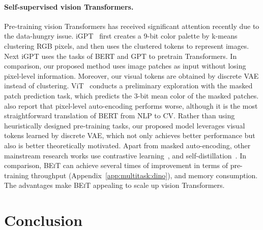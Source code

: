 \documentclass{article}
\newcommand\our{\textsc{BEiT}}
\begin{document}
\paragraph{Self-supervised vision Transformers.}
Pre-training vision Transformers has received significant attention recently due to the data-hungry issue.
iGPT~\citep{igpt} first creates a 9-bit color palette by k-means clustering RGB pixels, and then uses the clustered tokens to represent images. Next iGPT uses the tasks of BERT and GPT to pretrain Transformers.
In comparison, our proposed method uses image patches as input without losing pixel-level information. Moreover, our visual tokens are obtained by discrete VAE instead of clustering.
ViT~\citep{vit} conducts a preliminary exploration with the masked patch prediction task, which predicts the 3-bit mean color of the masked patches.
\citep{vit} also report that pixel-level auto-encoding performs worse, although it is the most straightforward translation of BERT from NLP to CV.
Rather than using heuristically designed pre-training tasks, our proposed model leverages visual tokens learned by discrete VAE, which not only achieves better performance but also is better theoretically motivated.
Apart from masked auto-encoding, other mainstream research works use contrastive learning~\citep{mocov3,swin:ssl}, and self-distillation~\citep{dino}.
In comparison, \our{} can achieve several times of improvement in terms of pre-training throughput (Appendix~\ref{app:multitask:dino}), and memory consumption.
The advantages make \our{} appealing to scale up vision Transformers.




\section{Conclusion}
\end{document}
